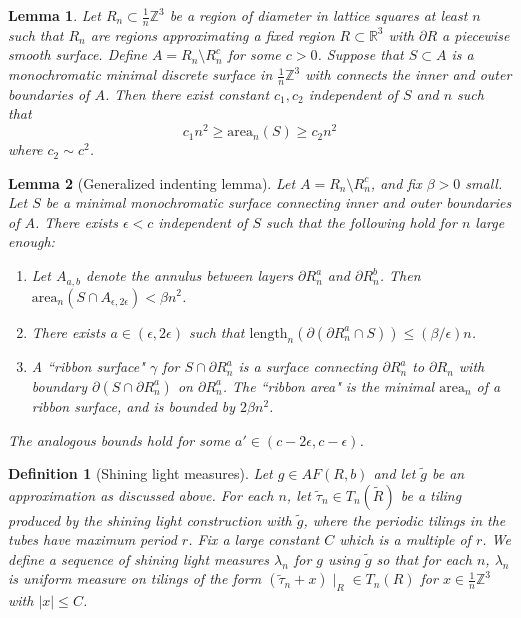 \documentclass[10pt,a4paper]{amsart}
\newtheorem{lemma}{Lemma}
\newtheorem{definition}{Definition}
\newcommand{\m}[1]{\mathbb{#1}}
\begin{document}
\begin{lemma}\label{lem:general_annulusbound}
    Let $R_n\subset \frac{1}{n} \m Z^3$ be a region of diameter in lattice squares at least $n$ such that $R_n$ are regions approximating a fixed region $R\subset \m R^3$ with $\partial R$ a piecewise smooth surface. Define $A = R_n\setminus R_n^c$ for some $c>0$. Suppose that $S\subset A$ is a monochromatic minimal discrete surface in $\frac{1}{n}\m Z^3$ with connects the inner and outer boundaries of $A$. Then there exist constant $c_1,c_2$ independent of $S$ and $n$ such that $$ c_1 n^2 \geq \text{area}_n(S) \geq c_2 n^2$$
    where $c_2 \sim c^2$.
\end{lemma}

\begin{lemma}[Generalized indenting lemma]\label{lem:generalized_indenting}
Let $A = R_n \setminus R_{n}^c$, and fix $\beta>0$ small. Let $S$ be a minimal monochromatic surface connecting inner and outer boundaries of $A$. There exists $\epsilon<c$ independent of $S$ such that the following hold for $n$ large enough:
    \begin{enumerate}
        \item Let $A_{a,b}$ denote the annulus between layers $\partial R_n^a$ and $\partial R_n^b$. Then $\text{area}_n(S\cap A_{\epsilon,2\epsilon}) < \beta n^2$. 
        \item There exists $a\in (\epsilon, 2\epsilon)$ such that $\text{length}_n(\partial(\partial R_n^a \cap S)) \leq (\beta/\epsilon) n$. 
    \item A ``ribbon surface" $\gamma$ for $S\cap \partial R_n^a$ is a surface connecting $\partial R_n^a$ to $\partial R_n$ with boundary $\partial (S\cap \partial R_n^a)$ on $\partial R_n^a$. The ``{ribbon area}" is the minimal $\text{area}_n$ of a ribbon surface, and is bounded by $2\beta n^2$. 
    \end{enumerate}
    The analogous bounds hold for some $a'\in (c-2\epsilon, c -\epsilon)$.
\end{lemma}

\begin{definition}[Shining light measures]\label{def:shininglight_measures}
Let $g\in AF(R,b)$ and let $\widetilde g$ be an approximation as discussed above. For each $n$, let $\widetilde \tau_n\in T_n(\widetilde R)$ be a tiling produced by the shining light construction with $\widetilde g$, where the periodic tilings in the tubes have maximum period $r$. Fix a large constant $C$ which is a multiple of $r$. We define a \textit{sequence of shining light measures} $\lambda_n$ for $g$ using $\widetilde g$ so that for each $n$, $\lambda_n$ is uniform measure on tilings of the form $(\widetilde \tau_n + x)\mid_R\in T_n(R)$ for $x\in \frac{1}{n}\m Z^3$ with $|x| \leq C$. 
\end{definition}
\end{document}
